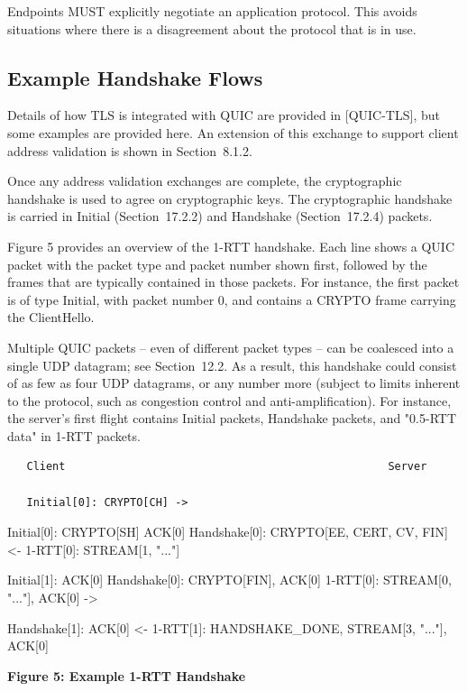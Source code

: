 \documentclass{article}
\begin{document}
Endpoints MUST explicitly negotiate an application protocol.  This avoids situations where there is a disagreement about the protocol that is in use.

\subsection{Example Handshake Flows}

Details of how TLS is integrated with QUIC are provided in [QUIC-TLS], but some examples are provided here.  An extension of this exchange to support client address validation is shown in Section~8.1.2.

Once any address validation exchanges are complete, the cryptographic handshake is used to agree on cryptographic keys.  The cryptographic handshake is carried in Initial (Section~17.2.2) and Handshake (Section~17.2.4) packets.

Figure 5 provides an overview of the 1-RTT handshake.  Each line shows a QUIC packet with the packet type and packet number shown first, followed by the frames that are typically contained in those packets.  For instance, the first packet is of type Initial, with packet number 0, and contains a CRYPTO frame carrying the ClientHello.

Multiple QUIC packets -- even of different packet types -- can be coalesced into a single UDP datagram; see Section~12.2.  As a result, this handshake could consist of as few as four UDP datagrams, or any number more (subject to limits inherent to the protocol, such as congestion control and anti-amplification).  For instance, the server's first flight contains Initial packets, Handshake packets, and "0.5-RTT data" in 1-RTT packets.

\begin{verbatim}
   Client                                                  Server

   Initial[0]: CRYPTO[CH] ->
\end{verbatim}

Initial[0]: CRYPTO[SH] ACK[0] Handshake[0]: CRYPTO[EE, CERT, CV, FIN] <- 1-RTT[0]: STREAM[1, "..."]

Initial[1]: ACK[0] Handshake[0]: CRYPTO[FIN], ACK[0] 1-RTT[0]: STREAM[0, "..."], ACK[0] ->

Handshake[1]: ACK[0] <- 1-RTT[1]: HANDSHAKE\_DONE, STREAM[3, "..."], ACK[0]

\begin{center}
\textbf{Figure 5: Example 1-RTT Handshake}
\end{center}
\end{document}
